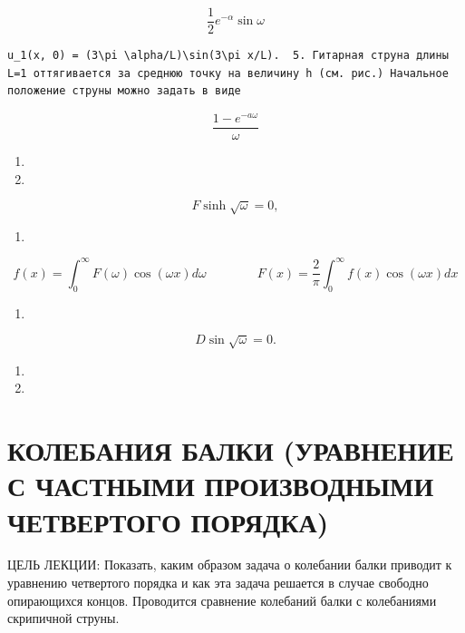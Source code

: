 \documentclass[
  ukrainian,
]{article}
\providecommand{\tightlist}{%
  \setlength{\itemsep}{0pt}\setlength{\parskip}{0pt}}
\begin{document}
\[
\frac{1}{2}e^{-\alpha}\sin\omega
\]

\begin{verbatim}
u_1(x, 0) = (3\pi \alpha/L)\sin(3\pi x/L).  5. Гитарная струна длины L=1 оттягивается за среднюю точку на величину h (см. рис.) Начальное положение струны можно задать в виде
\end{verbatim}

\[
\frac{1-e^{-a\omega}}{\omega}
\]

\begin{enumerate}
\def\labelenumi{\arabic{enumi}.}
\setcounter{enumi}{13}
\tightlist
\item
\item
\end{enumerate}

\[
F \sinh \sqrt{\omega} = 0,
\]

\begin{enumerate}
\def\labelenumi{\arabic{enumi}.}
\setcounter{enumi}{16}
\tightlist
\item
\end{enumerate}

\[
f(x) = \int_{0}^{\infty} F(\omega) \cos(\omega x) d\omega \qquad \qquad F(x) = \frac{2}{\pi} \int_{0}^{\infty} f(x) \cos(\omega x) dx
\]

\begin{enumerate}
\def\labelenumi{\arabic{enumi}.}
\setcounter{enumi}{18}
\tightlist
\item
\end{enumerate}

\[
D \sin \sqrt{\omega} = 0.
\]

\begin{enumerate}
\def\labelenumi{\arabic{enumi}.}
\setcounter{enumi}{18}
\tightlist
\item
\item
\end{enumerate}

\section{КОЛЕБАНИЯ БАЛКИ (УРАВНЕНИЕ С ЧАСТНЫМИ ПРОИЗВОДНЫМИ ЧЕТВЕРТОГО
ПОРЯДКА)}\label{ux43aux43eux43bux435ux431ux430ux43dux438ux44f-ux431ux430ux43bux43aux438-ux443ux440ux430ux432ux43dux435ux43dux438ux435-ux441-ux447ux430ux441ux442ux43dux44bux43cux438-ux43fux440ux43eux438ux437ux432ux43eux434ux43dux44bux43cux438-ux447ux435ux442ux432ux435ux440ux442ux43eux433ux43e-ux43fux43eux440ux44fux434ux43aux430}

ЦЕЛЬ ЛЕКЦИИ: Показать, каким образом задача о колебании балки приводит к
уравнению четвертого порядка и как эта задача решается в случае свободно
опирающихся концов. Проводится сравнение колебаний балки с колебаниями
скрипичной струны.
\end{document}
